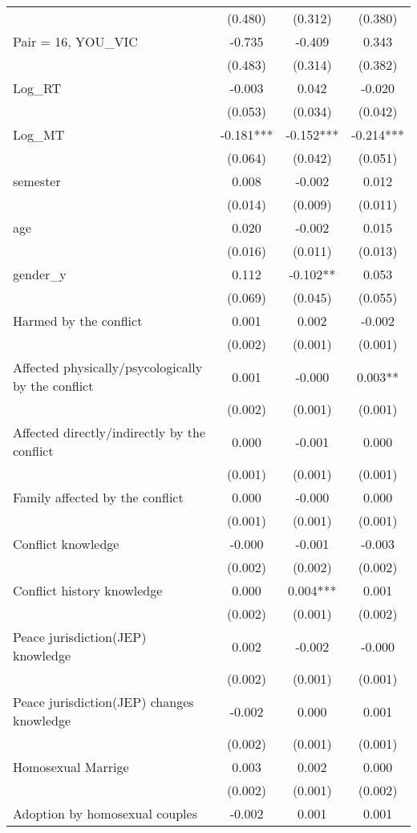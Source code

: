 \documentclass[]{article}
\begin{document}
\begin{tabular}{lccc}
 & (0.480) & (0.312) & (0.380) \\
Pair = 16, YOU\_VIC & -0.735 & -0.409 & 0.343 \\
 & (0.483) & (0.314) & (0.382) \\
Log\_RT & -0.003 & 0.042 & -0.020 \\
 & (0.053) & (0.034) & (0.042) \\
Log\_MT & -0.181*** & -0.152*** & -0.214*** \\
 & (0.064) & (0.042) & (0.051) \\
semester & 0.008 & -0.002 & 0.012 \\
 & (0.014) & (0.009) & (0.011) \\
age & 0.020 & -0.002 & 0.015 \\
 & (0.016) & (0.011) & (0.013) \\
gender\_y & 0.112 & -0.102** & 0.053 \\
 & (0.069) & (0.045) & (0.055) \\
Harmed by the conflict & 0.001 & 0.002 & -0.002 \\
 & (0.002) & (0.001) & (0.001) \\
Affected physically/psycologically by the conflict & 0.001 & -0.000 & 0.003** \\
 & (0.002) & (0.001) & (0.001) \\
Affected directly/indirectly by the conflict & 0.000 & -0.001 & 0.000 \\
 & (0.001) & (0.001) & (0.001) \\
Family affected by the conflict & 0.000 & -0.000 & 0.000 \\
 & (0.001) & (0.001) & (0.001) \\
Conflict knowledge & -0.000 & -0.001 & -0.003 \\
 & (0.002) & (0.002) & (0.002) \\
Conflict history knowledge & 0.000 & 0.004*** & 0.001 \\
 & (0.002) & (0.001) & (0.002) \\
Peace jurisdiction(JEP) knowledge & 0.002 & -0.002 & -0.000 \\
 & (0.002) & (0.001) & (0.001) \\
Peace jurisdiction(JEP) changes knowledge & -0.002 & 0.000 & 0.001 \\
 & (0.002) & (0.001) & (0.001) \\
Homosexual Marrige & 0.003 & 0.002 & 0.000 \\
 & (0.002) & (0.001) & (0.002) \\
Adoption by homosexual couples & -0.002 & 0.001 & 0.001 \\

\end{tabular}
\end{document}
